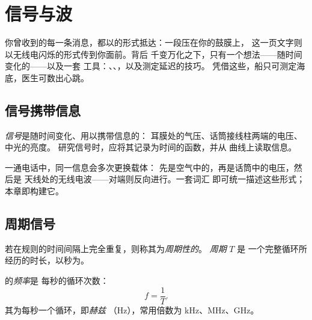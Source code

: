 \chapter{信号与波}\label{ch:g10:signals-and-waves}

你曾收到的每一条消息，都以的形式抵达：一段压在你的鼓膜上，
这一页文字则以无线电闪烁的形式传到你面前。背后
千变万化之下，只有一个想法——随时间变化的——以及一套
工具：、、，以及测定延迟的技巧。
凭借这些，船只可测定海底，医生可数出心跳。

\section{信号携带信息}

\begin{definition}[信号]\label{def:g10:signals-and-waves:signal}
\emph{信号}是随时间变化、用以携带信息的：
耳膜处的气压、话筒接线柱两端的电压、
中光的亮度。
研究信号时，应将其记录为时间的函数，并从
曲线上读取信息。
\end{definition}

一通电话中，同一信息会多次更换载体：
先是空气中的，再是话筒中的电压，然后是
天线处的无线电波——对端则反向进行。一套词汇
即可统一描述这些形式；本章即构建它。

\section{周期信号}

\begin{definition}[周期信号、周期]\label{def:g10:signals-and-waves:period}
若在规则的时间间隔上完全重复，则称其为\emph{周期性的}。
\emph{周期} $T$ 是
一个完整循环所经历的时长，以秒为。
\end{definition}

\begin{definition}[频率]\label{def:g10:signals-and-waves:frequency}
的\emph{频率}是
每秒的循环次数：
\[
f = \frac{1}{T} .
\]
其为每秒一个循环，即\emph{赫兹}
（\unit{Hz}），常用倍数为 \unit{kHz}、\unit{MHz}、\unit{GHz}。
\end{definition}

